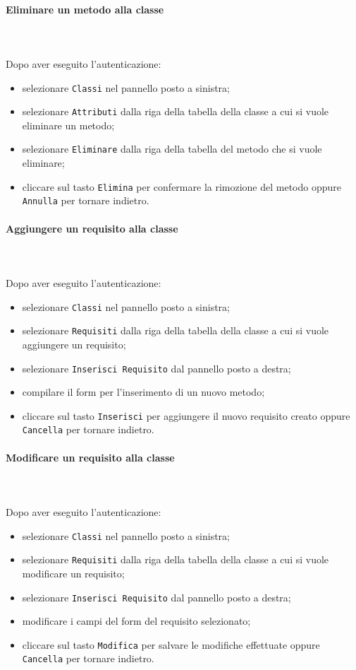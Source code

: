 	\paragraph{Eliminare un metodo alla classe} \mbox{}\\ \mbox{}\\
	Dopo aver eseguito l'autenticazione:
	\begin{itemize}
		\item selezionare \texttt{Classi} nel pannello posto a sinistra;
		\item selezionare \texttt{Attributi} dalla riga della tabella della classe
		a cui si vuole eliminare un metodo;\
		\item selezionare \texttt{Eliminare} dalla riga della tabella del metodo
		che si vuole eliminare;
		\item cliccare sul tasto \texttt{Elimina} per confermare la rimozione del metodo
		oppure \texttt{Annulla} per tornare indietro.
	\end{itemize}
	
	\paragraph{Aggiungere un requisito alla classe} \mbox{}\\ \mbox{}\\
	Dopo aver eseguito l'autenticazione:
	\begin{itemize}
		\item selezionare \texttt{Classi} nel pannello posto a sinistra;
		\item selezionare \texttt{Requisiti} dalla riga della tabella della classe
		a cui si vuole aggiungere un requisito;
		\item selezionare \texttt{Inserisci Requisito} dal pannello posto a destra;
		\item compilare il form per l'inserimento di un nuovo metodo;
		\item cliccare sul tasto \texttt{Inserisci} per aggiungere il nuovo requisito 
		creato oppure \texttt{Cancella} per tornare indietro.	
	\end{itemize}
	
	\paragraph{Modificare un requisito alla classe} \mbox{}\\ \mbox{}\\
	Dopo aver eseguito l'autenticazione:
	\begin{itemize}
		\item selezionare \texttt{Classi} nel pannello posto a sinistra;
		\item selezionare \texttt{Requisiti} dalla riga della tabella della classe
		a cui si vuole modificare un requisito;
		\item selezionare \texttt{Inserisci Requisito} dal pannello posto a destra;
		\item modificare i campi del form del requisito selezionato;
		\item cliccare sul tasto \texttt{Modifica} per salvare le modifiche effettuate
		oppure \texttt{Cancella} per tornare indietro.
	\end{itemize}
	
